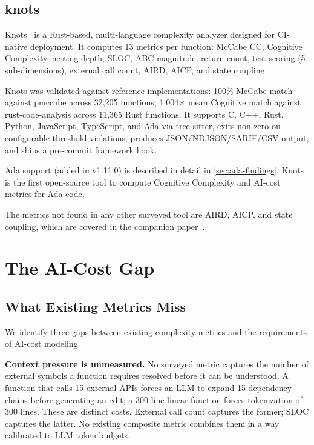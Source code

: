 \documentclass[10pt,twocolumn,letterpaper]{article}
\begin{document}
\subsection{knots}

Knots~\cite{knots} is a Rust-based, multi-language complexity analyzer
designed for CI-native deployment.  It computes 13 metrics per function:
McCabe CC, Cognitive Complexity, nesting depth, SLOC, ABC magnitude,
return count, test scoring (5 sub-dimensions), external call count,
AIRD, AICP, and state coupling.

Knots was validated against reference implementations: 100\% McCabe match
against pmccabe across 32,205 functions; 1.004$\times$ mean Cognitive
match against rust-code-analysis across 11,365 Rust functions.  It
supports C, C++, Rust, Python, JavaScript, TypeScript, and Ada via
tree-sitter, exits non-zero on configurable threshold violations, produces
JSON/NDJSON/SARIF/CSV output, and ships a pre-commit framework hook.

Ada support (added in v1.11.0) is described in detail in
\cref{sec:ada-findings}.  Knots is the first open-source tool to compute
Cognitive Complexity and AI-cost metrics for Ada code.

The metrics not found in any other surveyed tool are AIRD, AICP, and state
coupling, which are covered in the companion paper~\cite{knots-aird}.

\section{The AI-Cost Gap}
\label{sec:gap}

\subsection{What Existing Metrics Miss}

We identify three gaps between existing complexity metrics and the
requirements of AI-cost modeling.

\textbf{Context pressure is unmeasured.}  No surveyed metric captures the
number of external symbols a function requires resolved before it can be
understood.  A function that calls 15 external APIs forces an LLM to
expand 15 dependency chains before generating an edit; a 300-line linear
function forces tokenization of 300 lines.  These are distinct costs.
External call count captures the former; SLOC captures the latter.  No
existing composite metric combines them in a way calibrated to LLM token
budgets.
\end{document}
